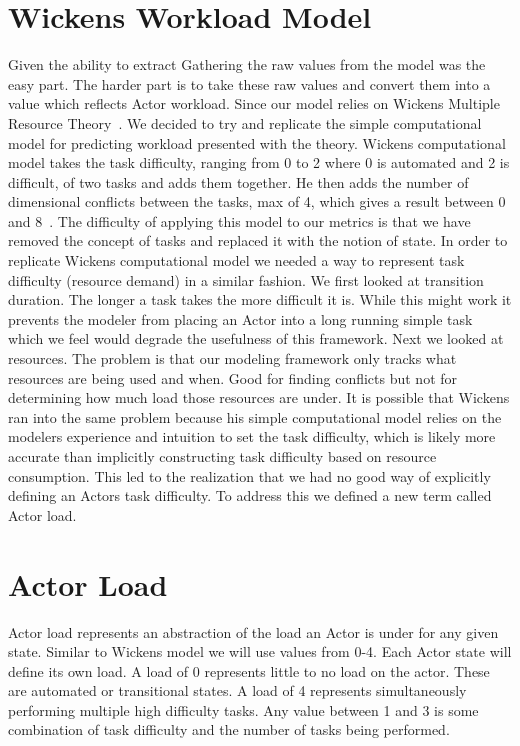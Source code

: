 \section{Wickens Workload Model}

Given the ability to extract Gathering the raw values from the model was the easy part.  The harder part is to take these raw values and convert them into a value which reflects Actor workload.  Since our model relies on Wickens Multiple Resource Theory~\cite{wickens2002multiple}.  We decided to try and replicate the simple computational model for predicting workload presented with the theory.  Wickens computational model takes the task difficulty, ranging from 0 to 2 where 0 is automated and 2 is difficult, of two tasks and adds them together.  He then adds the number of dimensional conflicts between the tasks, max of 4, which gives a result between 0 and 8~\cite{wickens2002multiple}.
	The difficulty of applying this model to our metrics is that we have removed the concept of tasks and replaced it with the notion of state.  In order to replicate Wickens computational model we needed a way to represent task difficulty (resource demand) in a similar fashion.  We first looked at transition duration.  The longer a task takes the more difficult it is.  While this might work it prevents the modeler from placing an Actor into a long running simple task which we feel would degrade the usefulness of this framework.  Next we looked at resources.  The problem is that our modeling framework only tracks what resources are being used and when.  Good for finding conflicts but not for determining how much load those resources are under.  It is possible that Wickens ran into the same problem because his simple computational model relies on the modelers experience and intuition to set the task difficulty, which is likely more accurate than implicitly constructing task difficulty based on resource consumption.  This led to the realization that we had no good way of explicitly defining an Actors task difficulty.  To address this we defined a new term called Actor load.  
	
\section{Actor Load}
Actor load represents an abstraction of the load an Actor is under for any given state.  Similar to Wickens model we will use values from 0-4.  Each Actor state will define its own load.  A load of 0 represents little to no load on the actor.  These are automated or transitional states.  A load of 4 represents simultaneously performing multiple high difficulty tasks.  Any value between 1 and 3 is some combination of task difficulty and the number of tasks being performed.


